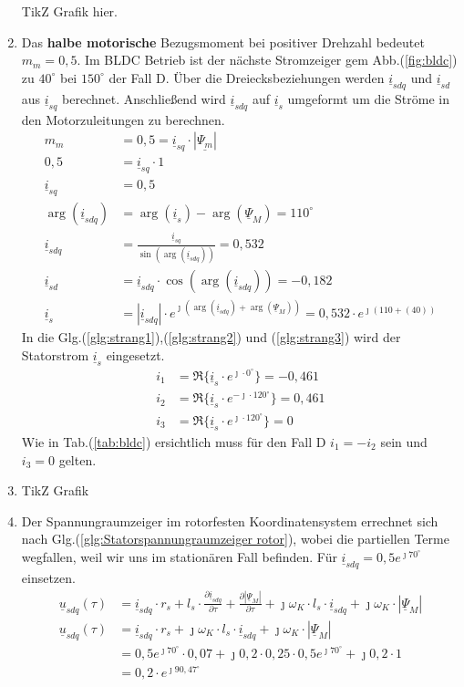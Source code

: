 \begin{solution}
\begin{enumerate}
TikZ Grafik hier.
\item Das \textbf{halbe motorische} Bezugsmoment bei positiver Drehzahl bedeutet $m_m = 0,5$. Im BLDC Betrieb ist der nächste Stromzeiger gem Abb.(\ref{fig:bldc}) zu $40^\circ$ bei $150^\circ$ der Fall D. Über die Dreiecksbeziehungen werden $\underline{i}_{sdq}$ und $\underline{i}_{sd}$ aus $\underline{i}_{sq}$ berechnet. Anschließend wird $\underline{i}_{sdq}$ auf $\underline{i}_{s}$ umgeformt um die Ströme in den Motorzuleitungen zu berechnen.
\begin{align}
m_m &= 0,5 = \underline{i}_{sq} \cdot |\underline{\Psi_m}|\\
0,5 &= \underline{i}_{sq} \cdot 1\\
\underline{i}_{sq} &= 0,5\\
\arg(\underline{i}_{sdq}) &= \arg(\underline{i}_{s}) -\arg(\underline{\Psi}_{M})=110^\circ\\
\underline{i}_{sdq} &= \frac{\underline{i}_{sq}}{\sin(\arg(\underline{i}_{sdq}))}= 0,532\\
\underline{i}_{sd} &= \underline{i}_{sdq} \cdot \cos(\arg(\underline{i}_{sdq})) = -0,182\\
\underline{i}_{s} &= |\underline{i}_{sdq}| \cdot e^{\jmath (\arg(\underline{i}_{sdq}) + \arg(\underline{\Psi}_{M}))}= 0,532 \cdot e^{\jmath ( 110 + (40))}
\end{align}
In die Glg.(\ref{glg:strang1}),(\ref{glg:strang2}) und (\ref{glg:strang3}) wird der Statorstrom $\underline{i}_s$ eingesetzt.
\begin{align}
i_1 & = \Re \{ \underline{i}_s \cdot e^{\jmath \cdot 0 ^\circ} \} = -0,461\\
i_2 & = \Re \{ \underline{i}_s \cdot e^{-\jmath \cdot 120 ^\circ} \} = 0,461 \\
i_3 & = \Re \{ \underline{i}_s \cdot e^{\jmath \cdot 120 ^\circ} \}=  0
\end{align}
Wie in Tab.(\ref{tab:bldc}) ersichtlich muss für den Fall D $i_1= -i_2$ sein und $i_3= 0$ gelten.
\item TikZ Grafik
\item Der Spannungraumzeiger im rotorfesten Koordinatensystem errechnet sich nach Glg.(\ref{glg:Statorspannungraumzeiger rotor}), wobei die partiellen Terme wegfallen, weil wir uns im stationären Fall befinden. Für $\underline{i}_{sdq}= 0,5 e^{\jmath 70^\circ}$ einsetzen.
\begin{align}
\underline{u}_{sdq}(\tau) &= \underline{i}_{sdq} \cdot r_s + l_s \cdot \frac{\partial \underline{i}_{sdq}}{\partial \tau} + \frac{\partial |\underline{\Psi}_M|}{\partial \tau} + \jmath \omega_K \cdot l_s \cdot \underline{i}_{sdq} + \jmath \omega_K \cdot |\underline{\Psi}_M|\\
\underline{u}_{sdq}(\tau) &= \underline{i}_{sdq} \cdot r_s + \jmath \omega_K \cdot l_s \cdot \underline{i}_{sdq} + \jmath \omega_K \cdot |\underline{\Psi}_M|\\
&= 0,5 e^{\jmath 70^\circ} \cdot 0,07 + \jmath 0,2 \cdot 0,25 \cdot 0,5 e^{\jmath 70^\circ}+\jmath 0,2 \cdot 1\\
&=0,2 \cdot e^{\jmath 90,47^\circ}
\end{align}
\end{enumerate}
\end{solution}